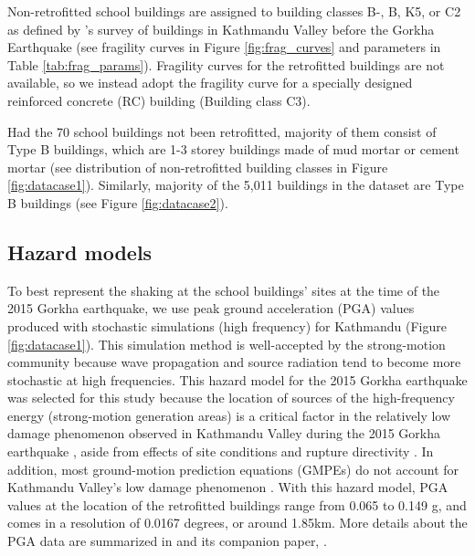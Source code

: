 \documentclass[utf8]{frontiersSCNS} %
\begin{document}
     Non-retrofitted school buildings are assigned to building classes B-, B, K5, or C2 as defined by \cite{jica2002study}'s survey of buildings in Kathmandu Valley before the Gorkha Earthquake (see fragility curves in Figure \ref{fig:frag_curves} and parameters in Table \ref{tab:frag_params}). Fragility curves for the retrofitted buildings are not available, so we instead adopt the fragility curve for a specially designed reinforced concrete (RC) building (Building class C3).
    
     Had the 70 school buildings not been retrofitted, majority of them consist of Type B buildings, which are 1-3 storey buildings made of mud mortar or cement mortar (see distribution of non-retrofitted building classes in Figure \ref{fig:datacase1}). Similarly, majority of the 5,011 buildings in the dataset are Type B buildings (see Figure \ref{fig:datacase2}).

\subsection{Hazard models}

To best represent the shaking at the school buildings' sites at the time of the 2015 Gorkha earthquake, we use peak ground acceleration (PGA) values produced with stochastic simulations (high frequency) for Kathmandu (Figure \ref{fig:datacase1}). This simulation method is well-accepted by the strong-motion community because wave propagation and source radiation tend to become more stochastic at high frequencies. This hazard model for the 2015 Gorkha earthquake was selected for this study because the location of sources of the high-frequency energy (strong-motion generation areas) is a critical factor in the relatively low damage phenomenon observed in Kathmandu Valley during the 2015 Gorkha earthquake \citep{gallovivc2016modeling, koketsu2016widespread}, aside from effects of site conditions and rupture directivity \citep{dixit2015strong, rajaure2017characterizing, gallovivc2016modeling, koketsu2016widespread}. In addition, most ground-motion prediction equations (GMPEs) do not account for Kathmandu Valley's low damage phenomenon \citep{dixit2015strong, martin2015ground, hough2016comparison, takai2016strong}. With this hazard model, PGA values at the location of the retrofitted buildings range from 0.065 to 0.149 g, and comes in a resolution of 0.0167 degrees, or around 1.85km.  More details about the PGA data are summarized in \cite{chen20192015} and its companion paper, \cite{wei20182015}.
\end{document}

